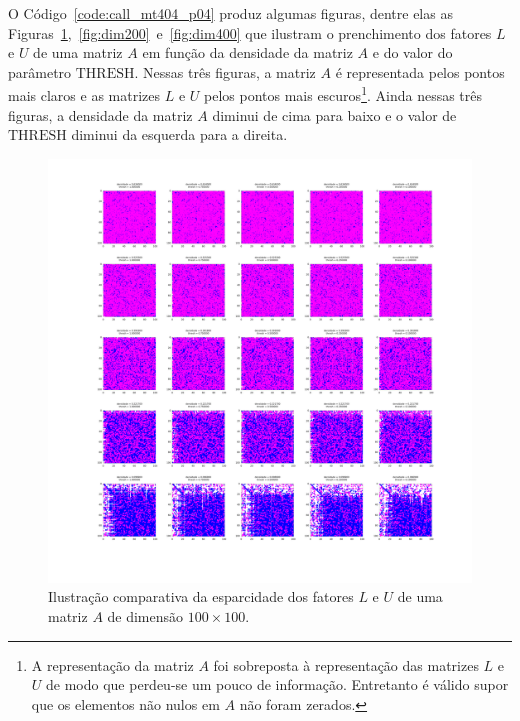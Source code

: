 \documentclass[12pt,a4paper]{article}
\begin{document}
O Código~\ref{code:call_mt404_p04} produz algumas figuras, dentre elas as
Figuras~\ref{fig:dim100},~\ref{fig:dim200}~e~\ref{fig:dim400} que ilustram o
prenchimento dos fatores $L$ e $U$ de uma matriz $A$ em função da densidade da
matriz $A$ e do valor do parâmetro $\mathrm{THRESH}$. Nessas três figuras, a
matriz $A$ é representada pelos pontos mais claros e as matrizes $L$ e $U$ pelos
pontos mais escuros\footnote{A representação da matriz $A$ foi sobreposta à
representação das matrizes $L$ e $U$ de modo que perdeu-se um pouco de
informação. Entretanto é válido supor que os elementos não nulos em $A$ não
foram zerados.}. Ainda nessas três figuras, a densidade da matriz $A$ diminui de
cima para baixo e o valor de $\mathrm{THRESH}$ diminui da esquerda para a
direita.
\begin{figure}[!htb]
    \begin{center}
        \includegraphics[width=\textwidth, trim=300 300 250 100, clip]{src/dim100.png}
    \end{center}
    \caption{Ilustração comparativa da esparcidade dos fatores $L$ e $U$ de uma
    matriz $A$ de dimensão $100 \times 100$.}
    \label{fig:dim100}
\end{figure}
\end{document}
